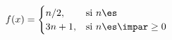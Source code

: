 \documentclass[preview]{standalone}
\begin{document}
\begin{align*}
f(x) = \begin{cases} n/2, & \text{si } n\es\par \\ 3n+1, & \text{si } n\es\impar \geq 0 \end{cases}
\end{align*}
\end{document}

